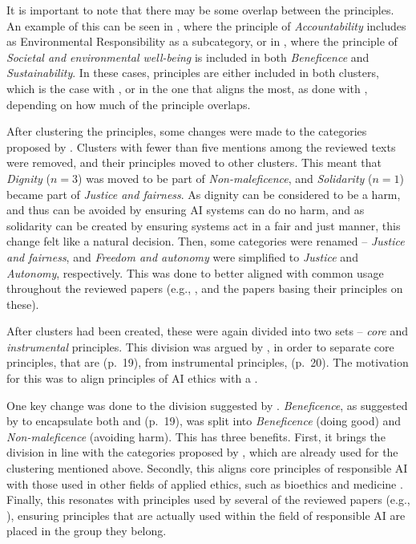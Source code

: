 It is important to note that there may be some overlap between the principles. An example of this can be seen in \textcite{Fjeld_2020}, where the principle of \textit{Accountability} includes as Environmental Responsibility as a subcategory, or in \textcite{Mikalef_2022}, where the principle of \textit{Societal and environmental well-being} is included in both \textit{Beneficence} and \textit{Sustainability}. In these cases, principles are either included in both clusters, which is the case with \textcite{Mikalef_2022}, or in the one that aligns the most, as done with \textcite{Fjeld_2020}, depending on how much of the principle overlaps.

After clustering the principles, some changes were made to the categories proposed by \textcite{Ryan_2021}. Clusters with fewer than five mentions among the reviewed texts were removed, and their principles moved to other clusters. This meant that \textit{Dignity} ($n = 3$) was moved to be part of \textit{Non-maleficence}, and \textit{Solidarity} ($n = 1$) became part of \textit{Justice and fairness}. As dignity can be considered to be a harm, and thus can be avoided by ensuring AI systems can do no harm, and as solidarity can be created by ensuring systems act in a fair and just manner, this change felt like a natural decision. Then, some categories were renamed -- \textit{Justice and fairness}, and \textit{Freedom and autonomy} were simplified to \textit{Justice} and \textit{Autonomy}, respectively. This was done to better aligned with common usage throughout the reviewed papers (e.g., \cite{Balagué_2021,Floridi_2018}, and the papers basing their principles on these).

After clusters had been created, these were again divided into two sets -- \emph{core} and \emph{instrumental} principles. This division was argued by \textcite{Canca_2020}, in order to separate core principles, that are  (p.~19), from instrumental principles,  (p.~20). The motivation for this was to align principles of AI ethics with a  \parencite[p.~19]{Canca_2020}.

One key change was done to the division suggested by \textcite{Canca_2020}. \textit{Beneficence}, as suggested by \textcite{Canca_2020} to encapsulate both  and  (p.~19), was split into \textit{Beneficence} (doing good) and \textit{Non-maleficence} (avoiding harm). This has three benefits. First, it brings the division in line with the categories proposed by \textcite{Ryan_2021}, which are already used for the clustering mentioned above. Secondly, this aligns core principles of responsible AI with those used in other fields of applied ethics, such as bioethics \parencite{Beauchamp_2001} and medicine \parencite{Gillon_2003,Gillon_1994}. Finally, this resonates with principles used by several of the reviewed papers (e.g., \cite{Balagué_2021,Floridi_2018,Jobin_2019,Nauck_2019}), ensuring principles that are actually used within the field of responsible AI are placed in the group they belong.

